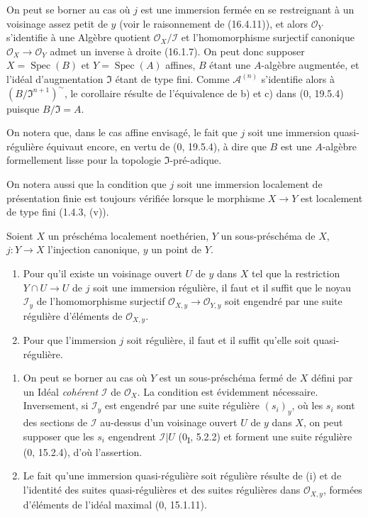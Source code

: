 On peut se borner au cas où $j$ est une immersion fermée en se restreignant
à un voisinage assez petit de $y$ (voir le raisonnement de (16.4.11)), et
alors $\mathcal{O}_Y$ s'identifie à une Algèbre quotient
$\mathcal{O}_X/\mathscr{I}$ et l'homomorphisme surjectif canonique
$\mathcal{O}_X\to\mathcal{O}_Y$ admet un
inverse à droite (16.1.7). On peut donc supposer
$X=\operatorname{Spec}(B)$ et $Y=\operatorname{Spec}(A)$ affines, $B$ étant
une $A$-algèbre augmentée, et l'idéal d'augmentation $\mathfrak{I}$ étant de
type fini. Comme $\mathscr{A}^{(n)}$ s'identifie alors à
$(B/\mathfrak{I}^{n+1})^{\sim}$, le corollaire résulte de l'équivalence de b)
et c) dans (0, 19.5.4) puisque $B/\mathfrak{I}=A$.

On notera que, dans le cas affine envisagé, le fait que $j$ soit une immersion
quasi-régulière équivaut encore, en vertu de (0, 19.5.4), à dire que $B$ est
une $A$-algèbre formellement lisse pour la topologie
$\mathfrak{I}$-pré-adique.

On notera aussi que la condition que $j$ soit une immersion localement de
présentation finie est toujours vérifiée lorsque le morphisme $X\to Y$ est
localement de type fini (1.4.3, (v)).

\begin{proposition}[16.9.10]
Soient $X$ un préschéma localement noethérien, $Y$ un sous-préschéma de $X$,
$j:Y\to X$ l'injection canonique, $y$ un point de $Y$.
\begin{enumerate}
  \item[(i)] Pour qu'il existe un voisinage ouvert $U$ de $y$ dans $X$ tel que
  la restriction $Y\cap U\to U$ de $j$ soit une immersion régulière, il faut
  et il suffit que le noyau $\mathscr{I}_y$ de l'homomorphisme surjectif
  $\mathcal{O}_{X,y}\to\mathcal{O}_{Y,y}$ soit engendré par une suite régulière
  d'éléments de $\mathcal{O}_{X,y}$.
  \item[(ii)] Pour que l'immersion $j$ soit régulière, il faut et il suffit
  qu'elle soit quasi-régulière.
\end{enumerate}
\end{proposition}

\begin{enumerate}
  \item[(i)] On peut se borner au cas où $Y$ est un sous-préschéma fermé de
  $X$ défini par un Idéal \emph{cohérent} $\mathscr{I}$ de $\mathcal{O}_X$.
  La condition est évidemment nécessaire. Inversement, si $\mathscr{I}_y$
  est engendré par une suite régulière $(s_i)_y$, où les $s_i$ sont des
  sections de $\mathscr{I}$ au-dessus d'un voisinage ouvert $U$ de $y$ dans
  $X$, on peut supposer que les $s_i$ engendrent $\mathscr{I}|U$
  (0\textsubscript{I}, 5.2.2) et forment une suite régulière (0, 15.2.4),
  d'où l'assertion.
  \item[(ii)] Le fait qu'une immersion quasi-régulière soit régulière résulte
  de (i) et de l'identité des suites quasi-régulières et des suites régulières
  dans $\mathcal{O}_{X,y}$, formées d'éléments de l'idéal maximal
  (0, 15.1.11).
\end{enumerate}

